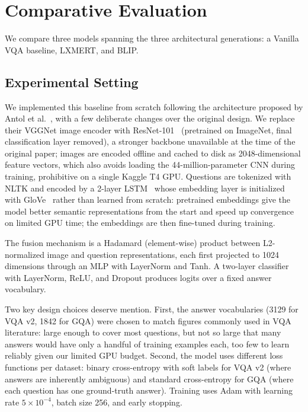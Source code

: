 \section{Comparative Evaluation}

We compare three models spanning the three architectural generations: a Vanilla VQA baseline, LXMERT, and BLIP.

\subsection{Experimental Setting}

 We implemented this baseline from scratch following the architecture proposed by Antol et al.~\cite{antol2015vqa}, with a few deliberate changes over the original design. We replace their VGGNet image encoder with ResNet-101~\cite{he2016resnet} (pretrained on ImageNet, final classification layer removed), a stronger backbone unavailable at the time of the original paper; images are encoded offline and cached to disk as 2048-dimensional feature vectors, which also avoids loading the 44-million-parameter CNN during training, prohibitive on a single Kaggle T4 GPU. Questions are tokenized with NLTK and encoded by a 2-layer LSTM~\cite{hochreiter1997lstm} whose embedding layer is initialized with GloVe~\cite{pennington2014glove} rather than learned from scratch: pretrained embeddings give the model better semantic representations from the start and speed up convergence on limited GPU time; the embeddings are then fine-tuned during training.

The fusion mechanism is a Hadamard (element-wise) product between L2-normalized image and question representations, each first projected to 1024 dimensions through an MLP with LayerNorm and Tanh. A two-layer classifier with LayerNorm, ReLU, and Dropout produces logits over a fixed answer vocabulary.

Two key design choices deserve mention. First, the answer vocabularies (3129 for VQA v2, 1842 for GQA) were chosen to match figures commonly used in VQA literature: large enough to cover most questions, but not so large that many answers would have only a handful of training examples each, too few to learn reliably given our limited GPU budget. Second, the model uses different loss functions per dataset: binary cross-entropy with soft labels for VQA v2 (where answers are inherently ambiguous) and standard cross-entropy for GQA (where each question has one ground-truth answer). Training uses Adam with learning rate $5 \times 10^{-4}$, batch size 256, and early stopping.

